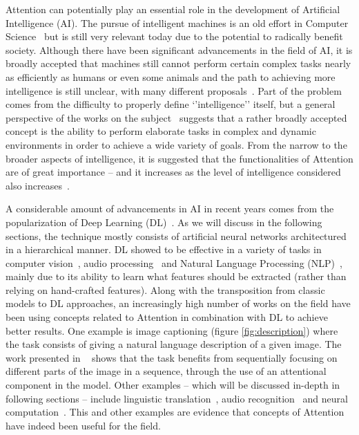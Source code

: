 \documentclass[English]{style/ic-tese-v3}
\begin{document}
Attention can potentially play an essential role in the development
of Artificial Intelligence (AI).
The pursue of intelligent machines is an old effort in Computer Science~\cite{ref:turing} but is still very
relevant today due to the potential to radically benefit society.
Although there have been significant advancements in the field of AI, it is broadly accepted that
machines still cannot perform certain complex tasks nearly as efficiently as humans or even some animals and
the path to achieving more intelligence is still unclear, with many different proposals~\cite{ref:mikolov}.
Part of the problem comes from the difficulty to properly define `'intelligence'' itself, but
a general perspective of the works on the subject~\cite{ref:aidef} suggests that a rather broadly accepted
concept is the ability to perform elaborate tasks in complex and dynamic environments
in order to achieve a wide variety of goals.
From the narrow to the broader aspects of intelligence, it is suggested that the functionalities of Attention
are of great importance -- and it increases
as the level of intelligence considered also increases~\cite{ref:helgason}.

A considerable amount of advancements in AI in recent years comes from
the popularization of Deep Learning (DL)~\cite{ref:dl}.
As we will discuss in the following sections, the technique mostly consists of
artificial neural networks architectured in a hierarchical manner.
DL showed to be effective in a variety of tasks in computer vision~\cite{ref:imagenet}\cite{ref:segmentation},
audio processing~\cite{ref:wavenet} and Natural Language
Processing (NLP)~\cite{ref:att-all-you-need}, mainly due to its ability
to learn what features should be extracted (rather than relying on hand-crafted features).
Along with the transposition from classic models to DL
approaches, an increasingly high number of works on the field
have been using concepts related to Attention in combination with DL to achieve better results.
One example is image captioning (figure \ref{fig:description}) where the task
consists of giving a natural language description of a given image.
The work presented in ~\cite{ref:img-captioning} shows that the task benefits from
sequentially focusing on different parts of the image in a sequence,
through the use of an attentional component in the model.
Other examples -- which will be discussed in-depth in following sections -- include linguistic
translation~\cite{ref:translation}, audio recognition~\cite{ref:audio} and neural computation~\cite{ref:ntm}.
This and other examples are evidence that concepts of Attention have indeed been useful for the field.
\end{document}
